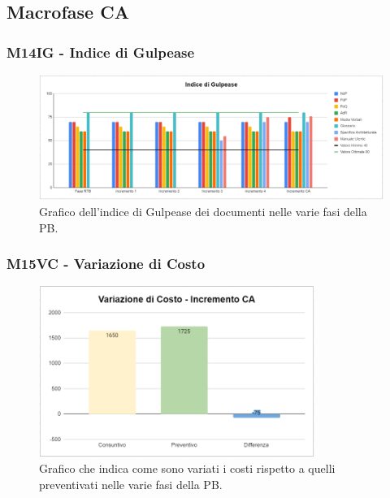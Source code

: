 \subsection{Macrofase CA}

\subsubsection{M14IG - Indice di Gulpease}
\begin{figure}[H]
    \centering\includegraphics[width=\textwidth, height=\textheight,keepaspectratio]{images/CA-Indice-di-Gulpease.png}
    \caption{Grafico dell'indice di Gulpease dei documenti nelle varie fasi della PB.}
\end{figure}    

\subsubsection{M15VC - Variazione di Costo}
\begin{figure}[H]
    \centering\includegraphics[width=0.8\textwidth, height=0.8\textheight,keepaspectratio]{images/CA-Variazione-di-Costo.png}
    \caption{Grafico che indica come sono variati i costi rispetto a quelli preventivati nelle varie fasi della PB.}
\end{figure}    

